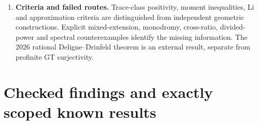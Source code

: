 \documentclass[11pt,a4paper]{article}
\theoremstyle{definition}\newtheorem{definition}[theorem]{Definition}
\theoremstyle{remark}\newtheorem{remark}[theorem]{Remark}
\begin{document}
\begin{enumerate}
finite recognition bound for semisimple abelian Artin--Tate objects;
BR-AT-01 and CC-F01/F01b give the exact shifted analytic factors.
The effective Siegel deduction, abelian-field Chebotarev and prime-search
bounds discharge their original conditional hypotheses.
\item \textbf{Criteria and failed routes.} Trace-class positivity,
moment inequalities, Li and approximation criteria are distinguished
from independent geometric constructions. Explicit mixed-extension,
monodromy, cross-ratio, divided-power and spectral counterexamples
identify the missing information. The 2026 rational Deligne--Drinfeld
theorem is an external result, separate from profinite GT surjectivity.
\end{enumerate}
\tableofcontents
\clearpage
\part{Checked findings and exactly scoped known results}
\end{document}
